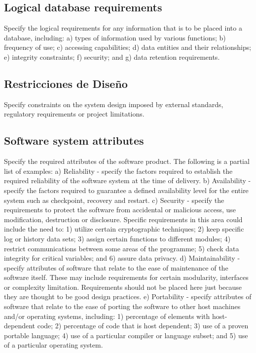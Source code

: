 \documentclass[12pt, a4paper, twoside]{article}
\begin{document}
 \subsection{Logical database requirements}
 Specify the logical requirements for any information that is to be placed into a database, including:
 a) types of information used by various functions;
 b) frequency of use;
 c) accessing capabilities;
 d) data entities and their relationships;
 e) integrity constraints;
 f) security; and
 g) data retention requirements.

 \subsection{Restricciones de Diseño}
 Specify constraints on the system design imposed by external standards, regulatory requirements or
 project limitations.

 \subsection{Software system attributes}
 Specify the required attributes of the software product. The following is a partial list of examples:
 a) Reliability - specify the factors required to establish the required reliability of the software system
 at the time of delivery.
 b) Availability - specify the factors required to guarantee a defined availability level for the entire
 system such as checkpoint, recovery and restart.
 c) Security - specify the requirements to protect the software from accidental or malicious access,
 use modification, destruction or disclosure. Specific requirements in this area could include the
 need to:
 1) utilize certain cryptographic techniques;
 2) keep specific log or history data sets;
 3) assign certain functions to different modules;
 4) restrict communications between some areas of the programme;
 5) check data integrity for critical variables; and
 6) assure data privacy.
 d) Maintainability - specify attributes of software that relate to the ease of maintenance of the
 software itself. These may include requirements for certain modularity, interfaces or complexity
 limitation. Requirements should not be placed here just because they are thought to be good design
 practices.
 e) Portability - specify attributes of software that relate to the ease of porting the software to other
 host machines and/or operating systems, including:
 1) percentage of elements with host-dependent code;
 2) percentage of code that is host dependent;
 3) use of a proven portable language;
 4) use of a particular compiler or language subset; and
 5) use of a particular operating system.
\end{document}
